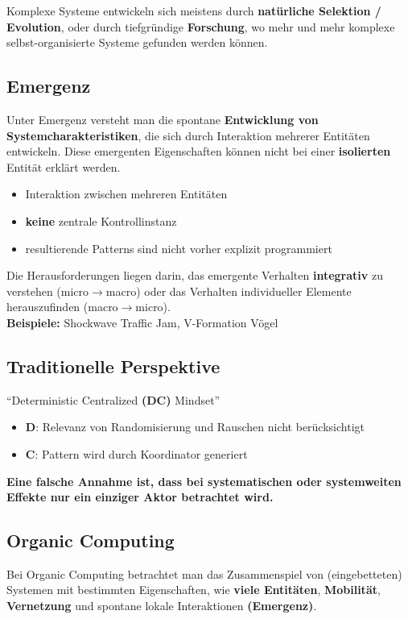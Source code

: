 \documentclass[a4paper]{article}
\begin{document}
Komplexe Systeme entwickeln sich meistens durch \textbf{natürliche Selektion / Evolution}, oder durch tiefgründige \textbf{Forschung}, wo mehr und mehr komplexe selbst-organisierte Systeme gefunden werden können.
\subsection{Emergenz}
Unter Emergenz versteht man die spontane \textbf{Entwicklung von Systemcharakteristiken}, die sich durch Interaktion mehrerer Entitäten entwickeln. Diese emergenten Eigenschaften können nicht bei einer \textbf{isolierten} Entität erklärt werden.
\begin{itemize}
	\item Interaktion zwischen mehreren Entitäten
	\item \textbf{keine} zentrale Kontrollinstanz
	\item resultierende Patterns sind nicht vorher explizit programmiert 
\end{itemize}
Die Herausforderungen liegen darin, das emergente Verhalten \textbf{integrativ} zu verstehen (micro$\rightarrow$macro) oder das Verhalten individueller Elemente herauszufinden (macro$\rightarrow$micro).\\
\textbf{Beispiele:} Shockwave Traffic Jam, V-Formation Vögel\\

\subsection{Traditionelle Perspektive}
``Deterministic Centralized \textbf{(DC)} Mindset''
\begin{itemize}
	\item \textbf{D}: Relevanz von Randomisierung und Rauschen nicht berücksichtigt 
	\item \textbf{C}: Pattern wird durch Koordinator generiert
\end{itemize} 
\textbf{Eine falsche Annahme ist, dass bei systematischen oder systemweiten Effekte nur ein einziger Aktor betrachtet wird.}

\subsection{Organic Computing}
Bei Organic Computing betrachtet man das Zusammenspiel von (eingebetteten) Systemen mit bestimmten Eigenschaften, wie \textbf{viele Entitäten}, \textbf{Mobilität}, \textbf{Vernetzung} und spontane lokale Interaktionen \textbf{(Emergenz)}.\\
\end{document}
